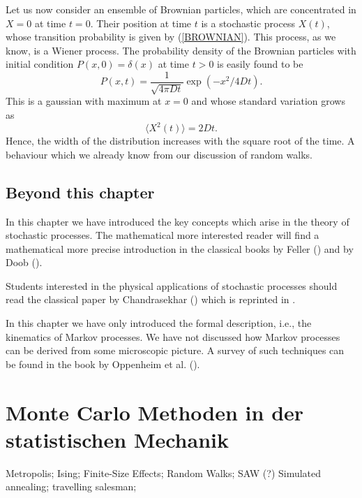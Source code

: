 Let us now consider an ensemble of Brownian particles, which are
concentrated in $X=0$ at time $t=0$. Their position at time $t$ is 
a stochastic process $X(t)$, whose transition probability is given 
by (\ref{BROWNIAN}). This process, as we know, is a Wiener 
process. The probability density of the Brownian particles  with 
initial condition $P(x,0) = \delta(x)$ at time $t>0$ is easily 
found to be
\begin{equation}
P(x,t) = \frac{1}{\sqrt{4 \pi D t}} \exp(-x^2/4Dt).
\end{equation}
This is a gaussian with maximum at $x=0$ and whose standard variation grows
as
\begin{equation}
\langle X^2(t) \rangle = 2 D t.
\end{equation}
Hence, the width of the distribution increases with the square 
root of the time. A behaviour which we already know from our 
discussion of random walks.

\section{Beyond this chapter}
In this chapter we have introduced the key concepts which arise
in the theory of stochastic processes. The mathematical more 
interested reader will find a mathematical more precise introduction 
in the classical books by Feller
(\cite{FELLER}) and by Doob (\cite{DOOB}). 

Students interested in the physical applications of stochastic processes
should read the classical paper by Chandrasekhar 
(\cite{CHANDRASEKHAR}) which is reprinted in \cite{WAX}.

In this chapter we have only introduced the formal description,
i.e., the kinematics of Markov processes. We have not discussed
how Markov processes can be derived from some microscopic picture.
A survey of such techniques can be found in the book by Oppenheim 
et al. (\cite{OPPENHEIM}).







\chapter{Monte Carlo Methoden in der statistischen Mechanik}
Metropolis; Ising; Finite-Size Effects; Random Walks; SAW (?)
Simulated annealing; travelling salesman;

